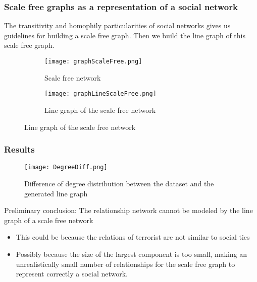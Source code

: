 \begin{frame}
\frametitle{Scale free graphs as a representation of a social network}

The transitivity and homophily particularities of social networks gives us guidelines for building a scale free graph. 
Then we build the line graph of this scale free graph.

\begin{figure}[H]
\begin{center}
    \begin{subfigure}[b]{0.4\textwidth}
        \texttt{[image: graphScaleFree.png]}
        \caption{Scale free network}
        \label{fig:Scalefree}
    \end{subfigure}
    \begin{subfigure}[b]{0.4\textwidth}
        \texttt{[image: graphLineScaleFree.png]}
        \caption{Line graph of the scale free network}
        \label{fig:lineG}
    \end{subfigure}
\label{fig:RelationshipScaleFree}
\end{center}
\end{figure}

\end{frame}


\begin{frame}
\frametitle{Results}

\begin{figure}[H]
\begin{center}
\texttt{[image: DegreeDiff.png]}
\caption{Difference of degree distribution between the dataset and the generated line graph}
\label{fig:degdiff}
\end{center}
\end{figure}

Preliminary conclusion: The relationship network cannot be modeled by the line graph of a scale free network
\begin{itemize}
\item This could be because the relations of terrorist are not similar to social ties
\item Possibly because the size of the largest component is too small, making an unrealistically small number of relationships for the scale free graph to represent correctly a social network.
\end{itemize}

\end{frame}


